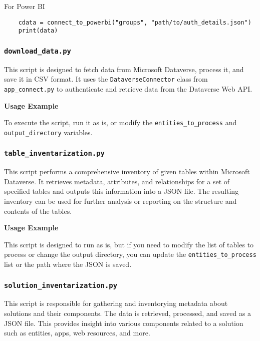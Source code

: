 For Power BI
\begin{verbatim}
	cdata = connect_to_powerbi("groups", "path/to/auth_details.json")
	print(data)	
\end{verbatim}

\subsubsection{\texttt{download\_data.py}}

This script is designed to fetch data from Microsoft Dataverse, process it, and save it in CSV format. It uses the \texttt{DataverseConnector} class from \texttt{app\_connect.py} to authenticate and retrieve data from the Dataverse Web API.

\newpage

\textbf{Usage Example}

To execute the script, run it as is, or modify the \texttt{entities\_to\_process} and \\ \texttt{output\_directory} variables.

\subsubsection{\texttt{table\_inventarization.py}}

This script performs a comprehensive inventory of given tables within Microsoft Dataverse. It retrieves metadata, attributes, and relationships for a set of specified tables and outputs this information into a JSON file. The resulting inventory can be used for further analysis or reporting on the structure and contents of the tables.

\textbf{Usage Example}

This script is designed to run as is, but if you need to modify the list of tables to process or change the output directory, you can update the \texttt{entities\_to\_process} list or the path where the JSON is saved.

\subsubsection{\texttt{solution\_inventarization.py}}

This script is responsible for gathering and inventorying metadata about solutions and their components. The data is retrieved, processed, and saved as a JSON file. This provides insight into various components related to a solution such as entities, apps, web resources, and more.

